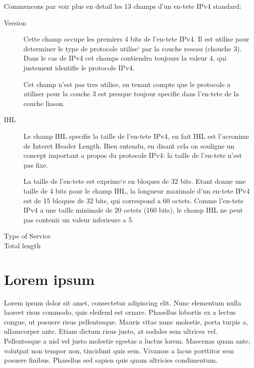 \documentclass[twoside,openright,a4paper,11pt,french]{article}
\begin{document}
Commencons par voir plus en detail les 13 champs d'un en-tete IPv4 standard:

\begin{description}
\item [Version] 
Cette champ occupe les premiers 4 bits de l'en-tete IPv4. Il est
utilise pour determiner le type de protocole utilise` par la couche
reseau (chouche 3). Dans le cas de IPv4 cet champs contiendra toujours
la valeur 4, qui justement identifie le protocole IPv4.

Cet champ n'est pas tres utilise, en tenant compte que le protocole 
a utiliser pour la couche 3 est presque toujour specifie dans l'en-tete
de la couche liason.


\item [IHL]
Le champ IHL specifie la taille de l'en-tete IPv4, en fait IHL est 
l'acronime de Interet Header Length. Bien entendu, en disant cela on souligne
un concept important a propos du protocole IPv4: la taille de l'en-tete n'est pas fixe.

La taille de l'en-tete est exprime`e en bloques de 32 bits. Etant donne une taille de
4 bits pour le champ IHL, la longueur maximale d'un en-tete IPv4 est de 15 bloques de
32 bits, qui correspond a 60 octets. Comme l'en-tete IPv4 a une taille minimale
de 20 octets (160 bits), le champ IHL ne peut pas contenir un valeur inferieure a 5.

\item [Type of Service]

\item [Total length]

\end{description}




\section{Lorem ipsum}

Lorem ipsum dolor sit amet, consectetur adipiscing elit. Nunc elementum nulla laoreet risus commodo, quis eleifend est ornare. Phasellus lobortis ex a lectus congue, ut posuere risus pellentesque. Mauris vitae nunc molestie, porta turpis a, ullamcorper ante. Etiam dictum risus justo, at sodales sem ultrices vel. Pellentesque a nisl vel justo molestie egestas a luctus lorem. Maecenas quam ante, volutpat non tempor non, tincidunt quis sem. Vivamus a lacus porttitor sem posuere finibus. Phasellus sed sapien quis quam ultricies condimentum.
\end{document}
